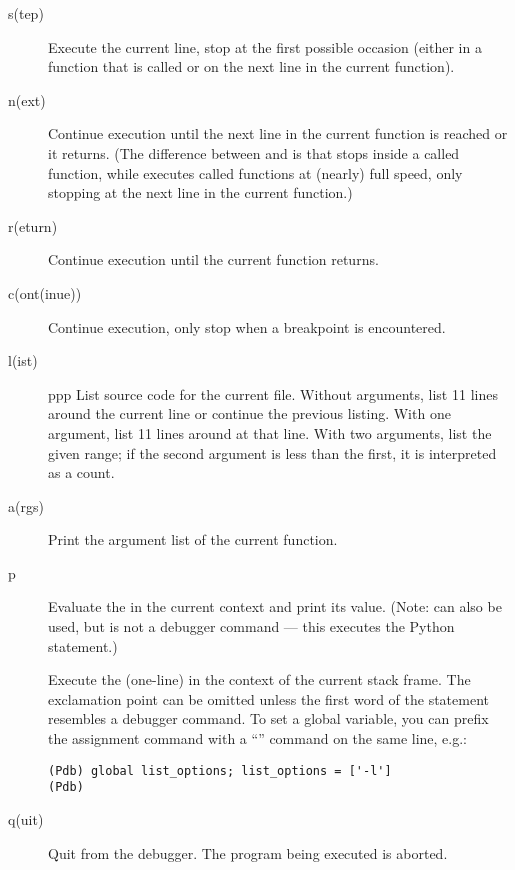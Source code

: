 \begin{description}
\item[s(tep)]

Execute the current line, stop at the first possible occasion
(either in a function that is called or on the next line in the
current function).

\item[n(ext)]

Continue execution until the next line in the current function
is reached or it returns.  (The difference between  and
 is that  stops inside a called function, while
 executes called functions at (nearly) full speed, only
stopping at the next line in the current function.)

\item[r(eturn)]

Continue execution until the current function returns.

\item[c(ont(inue))]

Continue execution, only stop when a breakpoint is encountered.

\item[l(ist) ]
ppp
List source code for the current file.  Without arguments, list 11
lines around the current line or continue the previous listing.  With
one argument, list 11 lines around at that line.  With two arguments,
list the given range; if the second argument is less than the first,
it is interpreted as a count.

\item[a(rgs)]

Print the argument list of the current function.

\item[p ]

Evaluate the  in the current context and print its
value.  (Note:  can also be used, but is not a debugger
command --- this executes the Python  statement.)

\item[\optional{!}]

Execute the (one-line)  in the context of
the current stack frame.
The exclamation point can be omitted unless the first word
of the statement resembles a debugger command.
To set a global variable, you can prefix the assignment
command with a ``'' command on the same line, e.g.:

\begin{verbatim}
(Pdb) global list_options; list_options = ['-l']
(Pdb)
\end{verbatim}

\item[q(uit)]

Quit from the debugger.
The program being executed is aborted.

\end{description}

